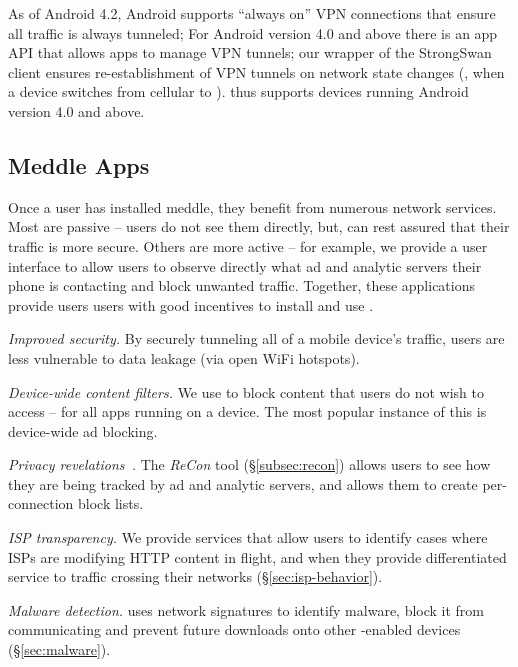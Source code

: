 As of Android 4.2, Android supports ``always on'' VPN connections that ensure all traffic is always tunneled;
For Android version 4.0 and above there is an app API that allows apps to manage VPN tunnels; our wrapper of the StrongSwan client ensures re-establishment of VPN tunnels on network state changes (\eg, when a device switches from cellular to \wifi).
\meddle thus supports devices running Android version 4.0 and above.

\subsection{Meddle Apps}

Once a user has installed meddle, they benefit from numerous network services. Most are passive -- users do not see them directly, but, \eg{} can rest assured that their traffic is more secure. Others are more active -- for example, we provide a user interface to allow users to observe directly what ad and analytic servers their phone is contacting and block unwanted traffic. Together, these applications provide users users with good incentives to install and use \meddle.

\noindent \emph{Improved security.} By securely tunneling all of a mobile device's traffic, users 
are less vulnerable to data leakage (\eg via open WiFi hotspots). 

\noindent \emph{Device-wide content filters.} We use \meddle to block content that users do 
not wish to access -- for all apps running on a device. The most popular instance of this is 
device-wide ad blocking.

\noindent \emph{Privacy revelations~\cite{wetherall:revelations}.} The \emph{ReCon} tool (\S\ref{subsec:recon}) allows users to see how they are being 
tracked by ad and analytic servers, and allows them to create per-connection block lists.  

\noindent \emph{ISP transparency.} We provide services that allow users to identify cases where 
ISPs are modifying HTTP content in flight, and when they provide differentiated service to 
traffic crossing their networks (\S\ref{sec:isp-behavior}).

\noindent \emph{Malware detection.} \meddle uses network signatures to identify malware, block it from 
communicating and prevent future downloads onto other \meddle-enabled devices (\S\ref{sec:malware}).  



